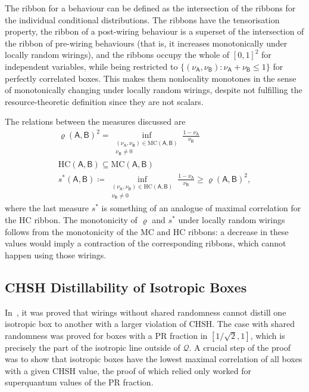 \documentclass[10pt, a4paper]{article}
\numberwithin{equation}{section} %
\theoremstyle{definition}
\theoremstyle{plain}
\newcommand{\st}{\mathrel{:}} %
\newcommand{\?}{\mathrel{?}} %
\newcommand{\crv}[1]{\mathsf{#1}}
\newcommand{\HC}{\mathrm{HC}}
\newcommand{\MC}{\mathrm{MC}}
\newcommand{\Qs}{\mathcal{Q}}
\begin{document}
                  The ribbon for a behaviour can be defined as the intersection of the ribbons for the individual conditional distributions. The ribbons have the tensorisation property, the ribbon of a post-wiring behaviour is a superset of the intersection of the ribbon of pre-wiring behaviours (that is, it increases monotonically under locally random wirings), and the ribbons occupy the whole of \({[0,1]}^2\) for independent variables, while being restricted to \(\{(\nu_{\crv{A}}, \nu_{\crv{B}}) \st \nu_{\crv{A}} + \nu_{\crv{B}} \leq 1\}\) for perfectly correlated boxes. This makes them nonlocality monotones in the sense of monotonically changing under locally random wirings, despite not fulfilling the resource-theoretic definition since they are not scalars.

                  The relations between the measures discussed are
                  \begin{gather}
                    {\varrho(\crv{A},\crv{B})}^2 = \inf_{\substack{(\nu_{\crv{A}}, \nu_{\crv{B}}) \in \MC(\crv{A},\crv{B}) \\ \nu_{\crv{B}} \neq 0}} \frac{1 - \nu_{\crv{A}}}{\nu_{\crv{B}}} \\
                    \HC(\crv{A},\crv{B}) \subseteq \MC(\crv{A},\crv{B}) \\
                    s^*(\crv{A},\crv{B}) \coloneqq \inf_{\substack{(\nu_{\crv{A}}, \nu_{\crv{B}}) \in \HC(\crv{A},\crv{B}) \\ \nu_{\crv{B}} \neq 0}} \frac{1 - \nu_{\crv{A}}}{\nu_{\crv{B}}} \geq {\varrho(\crv{A},\crv{B})}^2,
                  \end{gather}
                  where the last measure \(s^*\) is something of an analogue of maximal correlation for the HC ribbon. The monotonicity of \(\varrho\) and \(s^*\) under locally random wirings follows from the monotonicity of the MC and HC ribbons: a decrease in these values would imply a contraction of the corresponding ribbons, which cannot happen using those wirings.

                  \subsection{CHSH Distillability of Isotropic Boxes}\label{sec:wirmono_isodist}

                  In~\cite{NLMonotones}, it was proved that wirings without shared randomness cannot distill one isotropic box to another with a larger violation of CHSH. The case with shared randomness was proved for boxes with a PR fraction in \([1/\sqrt{2}, 1]\), which is precisely the part of the isotropic line outside of \(\Qs\). A crucial step of the proof was to show that isotropic boxes have the lowest maximal correlation of all boxes with a given CHSH value, the proof of which relied only worked for superquantum values of the PR fraction.
\end{document}
